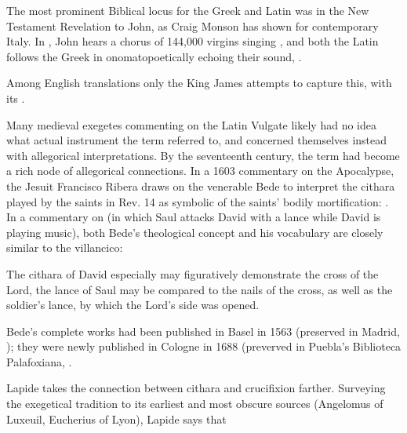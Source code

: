 The most prominent Biblical locus for the Greek  and Latin
 was in the New Testament Revelation to John, as Craig Monson has
shown for contemporary Italy.%
    \autocite[88--95]{Monson:DivasConvent}
In , John hears a chorus of 144,000 virgins singing
, and both the Latin follows the Greek in
onomatopoetically echoing their sound, .%
\begin{Footnote}
    Among English translations only the King James attempts to capture this,
    with its .
\end{Footnote}
Many medieval exegetes commenting on the Latin Vulgate likely had no idea what
actual instrument the term  referred to, and concerned themselves
instead with allegorical interpretations.
By the seventeenth century, the term had become a rich node of allegorical
connections.
In a 1603 commentary on the Apocalypse, the Jesuit Francisco Ribera draws on
the venerable Bede to interpret the cithara played by the saints in Rev. 14 as
symbolic of the saints' bodily mortification: .%
    \Autocite[429]{Ribera:Apocalypse}
In a commentary on  (in which Saul attacks David with a
lance while David is playing music), both Bede's theological concept and his
vocabulary are closely similar to the villancico: 
\begin{quoting} 
    The cithara  of David especially may figuratively
    demonstrate the cross of the Lord, the lance  of Saul may
    be compared to the nails  of the cross, as well as the
    soldier's lance, by which the Lord's side was opened.%
\begin{Footnote}
    \Autocite[123]{Bede:Commentaries2}
    Bede's complete works had been published in Basel in 1563 (preserved in
    Madrid, ); they were newly published in Cologne in 1688
    (preverved in Puebla's Biblioteca Palafoxiana, .
\end{Footnote}
\end{quoting}
Lapide takes the connection between cithara and crucifixion farther.  
Surveying the exegetical tradition to its earliest and most obscure sources
(Angelomus of Luxeuil, Eucherius of Lyon), Lapide says that
